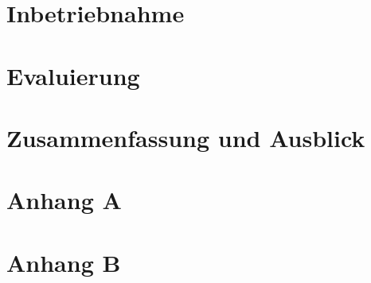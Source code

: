 \documentclass[oneside]{ausarbeitung}
\begin{document}
\chapter{Inbetriebnahme}
\label{cha:inbetriebnahme}


\chapter{Evaluierung}
\label{cha:evaluierung}


\chapter{Zusammenfassung und Ausblick}
\label{cha:zusammenfassung}


\appendix

\printbibliography[heading=bibintoc]

\chapter{Anhang A}

\chapter{Anhang B}
\end{document}
